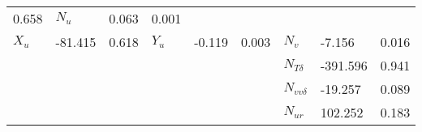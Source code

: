 \begin{table}[!htb]
\begin{tabular}{l l l l l l l l l }
0.658
&

\( N_{u} \)
&

0.063
&

0.001
\\


\( X_{u} \)
&

-81.415
&

0.618
&

\( Y_{u} \)
&

-0.119
&

0.003
&

\( N_{v} \)
&

-7.156
&

0.016
\\
&&&&&&

\( N_{T\delta} \)
&

-391.596
&

0.941
\\
&&&&&&

\( N_{vv\delta} \)
&

-19.257
&

0.089
\\
&&&&&&

\( N_{ur} \)
&

102.252
&

0.183
\\
\bottomrule
\end{tabular}

\end{table}

